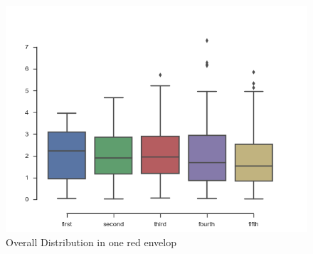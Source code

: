 \documentclass[10pt,journal]{IEEEtran}
\begin{document}
\begin{figure}[!ht]
	\centering
	\includegraphics[width=0.7\columnwidth,height=0.6\linewidth]{output.png}
	\caption{Overall Distribution in one red envelop}
\end{figure}
\\
\pagebreak
\end{document}
